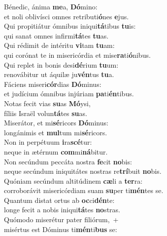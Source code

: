 \evenverse Bénedic, ánima \textbf{me}a, \textbf{Dó}mino:~\*\\
\evenverse et noli oblivísci omnes retributi\textbf{ó}nes \textbf{e}jus.\\
\oddverse Qui propitiátur ómnibus iniqui\textbf{tá}tibus \textbf{tu}is:~\*\\
\oddverse qui sanat omnes infirmi\textbf{tá}tes \textbf{tu}as.\\
\evenverse Qui rédimit de intéritu \textbf{vi}tam \textbf{tu}am:~\*\\
\evenverse qui corónat te in misericórdia et mise\textbf{ra}ti\textbf{ó}nibus.\\
\oddverse Qui replet in bonis desi\textbf{dé}rium \textbf{tu}um:~\*\\
\oddverse renovábitur ut áquilæ ju\textbf{vén}tus \textbf{tu}a.\\
\evenverse Fáciens miseri\textbf{cór}dias \textbf{Dó}minus:~\*\\
\evenverse et judícium ómnibus injúriam \textbf{pa}ti\textbf{én}tibus.\\
\oddverse Notas fecit vias \textbf{su}as \textbf{Mó}ysi,~\*\\
\oddverse fíliis Israël volun\textbf{tá}tes \textbf{su}as.\\
\evenverse Miserátor, et mi\textbf{sé}ricors \textbf{Dó}minus:~\*\\
\evenverse longánimis et \textbf{mul}tum mi\textbf{sé}ricors.\\
\oddverse Non in perpétuum \textbf{i}ra\textbf{scé}tur:~\*\\
\oddverse neque in ætérnum \textbf{com}mi\textbf{ná}bitur.\\
\evenverse Non secúndum peccáta nostra \textbf{fe}cit \textbf{no}bis:~\*\\
\evenverse neque secúndum iniquitátes nostras re\textbf{trí}buit \textbf{no}bis.\\
\oddverse Quóniam secúndum altitúdinem \textbf{cæ}li a \textbf{ter}ra:~\*\\
\oddverse corroborávit misericórdiam suam \textbf{su}per ti\textbf{mén}tes se.\\
\evenverse Quantum distat ortus ab \textbf{oc}ci\textbf{dén}te:~\*\\
\evenverse longe fecit a nobis iniqui\textbf{tá}tes \textbf{no}stras.\\
\oddverse Quómodo miserétur pater filiórum,~+\\
\oddverse  misértus est Dóminus ti\textbf{mén}ti\textbf{bus} se:~\*\\
